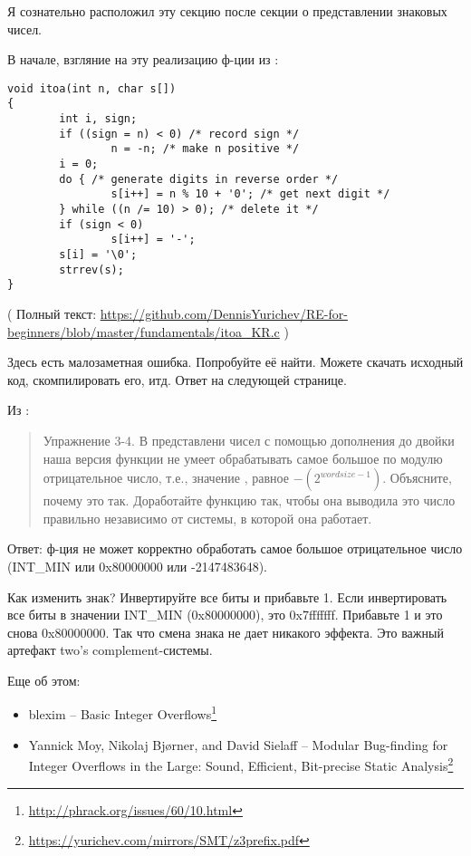 
Я сознательно расположил эту секцию после секции о представлении знаковых чисел.

В начале, взгляние на эту реализацию ф-ции  из \InSqBrackets{\KRBook}:

\begin{lstlisting}[style=customc]
void itoa(int n, char s[])
{
        int i, sign;
        if ((sign = n) < 0) /* record sign */
                n = -n; /* make n positive */
        i = 0;
        do { /* generate digits in reverse order */
                s[i++] = n % 10 + '0'; /* get next digit */
        } while ((n /= 10) > 0); /* delete it */
        if (sign < 0)
                s[i++] = '-';
        s[i] = '\0';
        strrev(s);
}
\end{lstlisting}

( Полный текст: \url{https://github.com/DennisYurichev/RE-for-beginners/blob/master/fundamentals/itoa_KR.c} )

Здесь есть малозаметная ошибка. Попробуйте её найти. Можете скачать исходный код, скомпилировать его, итд.
Ответ на следующей странице.

\clearpage

Из \InSqBrackets{\KRBook}:

\begin{framed}
\begin{quotation}
Упражнение 3-4. В представлени чисел с помощью дополнения до двойки наша версия функции 
не умеет обрабатывать самое большое по модулю отрицательное число, т.е., значение 
, равное $-(2^{wordsize-1})$. Объясните, почему это так. Доработайте функцию так, чтобы она
выводила это число правильно независимо от системы, в которой она работает.
\end{quotation}
\end{framed}

Ответ: ф-ция не может корректно обработать самое большое отрицательное число (INT\_MIN или 0x80000000 или -2147483648).

Как изменить знак? Инвертируйте все биты и прибавьте 1.
Если инвертировать все биты в значении INT\_MIN (0x80000000), это 0x7fffffff. Прибавьте 1 и это снова 0x80000000.
Так что смена знака не дает никакого эффекта.
Это важный артефакт two's complement-системы.

Еще об этом:

\begin{itemize}
\item blexim -- Basic Integer Overflows\footnote{\url{http://phrack.org/issues/60/10.html}}

\item Yannick Moy, Nikolaj Bjørner, and David Sielaff -- Modular Bug-finding for Integer Overflows in the Large: Sound, Efficient, Bit-precise Static Analysis\footnote{\url{https://yurichev.com/mirrors/SMT/z3prefix.pdf}}
\end{itemize}

